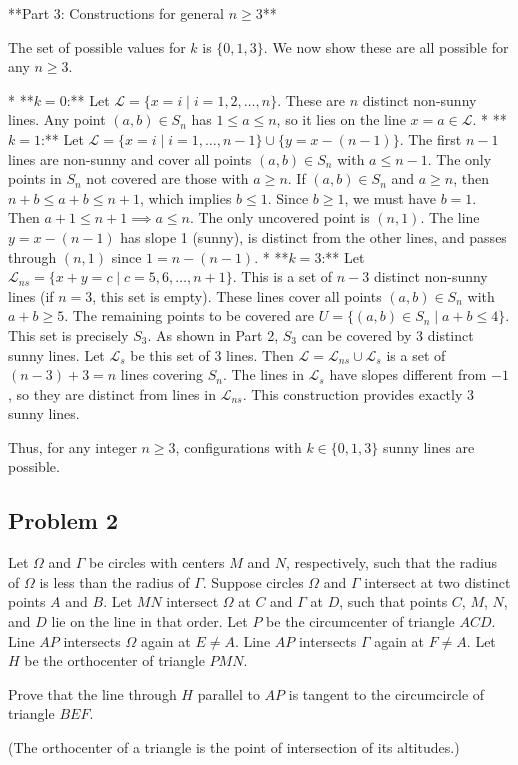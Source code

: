 **Part 3: Constructions for general $n \ge 3$**

The set of possible values for $k$ is $\{0, 1, 3\}$. We now show these are all possible for any $n \ge 3$.

*   **$k=0$:** Let $\mathcal{L} = \{x=i \mid i=1, 2, \dots, n\}$. These are $n$ distinct non-sunny lines. Any point $(a,b) \in S_n$ has $1 \le a \le n$, so it lies on the line $x=a \in \mathcal{L}$.
*   **$k=1$:** Let $\mathcal{L} = \{x=i \mid i=1, \dots, n-1\} \cup \{y=x-(n-1)\}$. The first $n-1$ lines are non-sunny and cover all points $(a,b) \in S_n$ with $a \le n-1$. The only points in $S_n$ not covered are those with $a \ge n$. If $(a,b) \in S_n$ and $a \ge n$, then $n+b \le a+b \le n+1$, which implies $b \le 1$. Since $b \ge 1$, we must have $b=1$. Then $a+1 \le n+1 \implies a \le n$. The only uncovered point is $(n,1)$. The line $y=x-(n-1)$ has slope 1 (sunny), is distinct from the other lines, and passes through $(n,1)$ since $1 = n-(n-1)$.
*   **$k=3$:** Let $\mathcal{L}_{ns} = \{x+y=c \mid c=5, 6, \dots, n+1\}$. This is a set of $n-3$ distinct non-sunny lines (if $n=3$, this set is empty). These lines cover all points $(a,b) \in S_n$ with $a+b \ge 5$. The remaining points to be covered are $U = \{(a,b) \in S_n \mid a+b \le 4\}$. This set is precisely $S_3$. As shown in Part 2, $S_3$ can be covered by 3 distinct sunny lines. Let $\mathcal{L}_s$ be this set of 3 lines. Then $\mathcal{L} = \mathcal{L}_{ns} \cup \mathcal{L}_s$ is a set of $(n-3)+3=n$ lines covering $S_n$. The lines in $\mathcal{L}_s$ have slopes different from $-1$, so they are distinct from lines in $\mathcal{L}_{ns}$. This construction provides exactly 3 sunny lines.

Thus, for any integer $n \ge 3$, configurations with $k \in \{0, 1, 3\}$ sunny lines are possible.

\subsection{Problem 2}

\begin{problem}
Let $\Omega$ and $\Gamma$ be circles with centers $M$ and $N$, respectively, such that the radius of $\Omega$ is less than the radius of $\Gamma$. Suppose circles $\Omega$ and $\Gamma$ intersect at two distinct points $A$ and $B$. Let $MN$ intersect $\Omega$ at $C$ and $\Gamma$ at $D$, such that points $C$, $M$, $N$, and $D$ lie on the line in that order. Let $P$ be the circumcenter of triangle $ACD$. Line $AP$ intersects $\Omega$ again at $E \ne A$. Line $AP$ intersects $\Gamma$ again at $F \ne A$. Let $H$ be the orthocenter of triangle $PMN$.

Prove that the line through $H$ parallel to $AP$ is tangent to the circumcircle of triangle $BEF$.

(The orthocenter of a triangle is the point of intersection of its altitudes.)
\end{problem}

